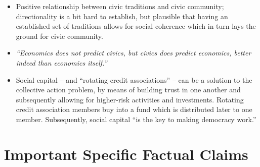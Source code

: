 \documentclass[12pt]{article}
\begin{document}
\begin{itemize}[leftmargin=*, itemsep=4pt]
    \item Positive relationship between civic traditions and civic community; directionality is a bit hard to establish, but plausible that having an established set of traditions allows for social coherence which in turn lays the ground for civic community.
    \item \emph{``Economics does not predict civics, but civics does predict economics, better indeed than economics itself.''}
    \item Social capital -- and ``rotating credit associations'' -- can be a solution to the collective action problem, by means of building trust in one another and subsequently allowing for higher-risk activities and investments. Rotating credit association members buy into a fund which is distributed later to one member. Subsequently, social capital ``is the key to making democracy work.''
\end{itemize}


\section{Important Specific Factual Claims}
\end{document}
